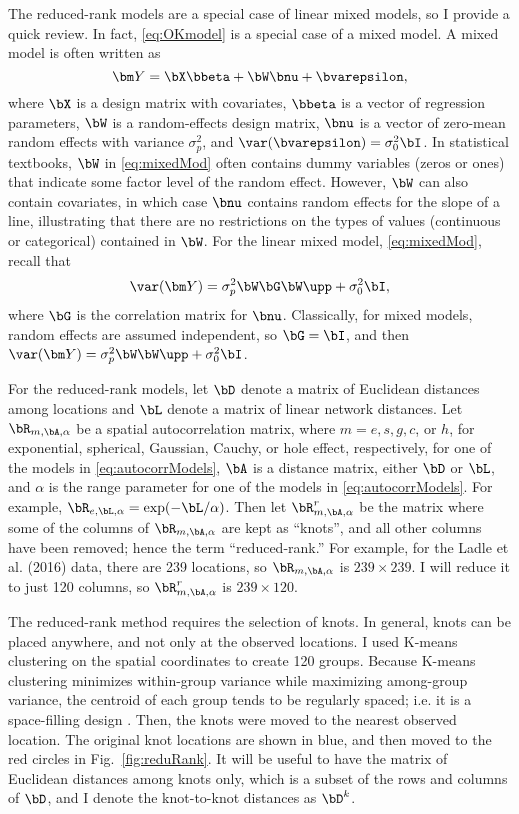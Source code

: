 The reduced-rank models are a special case of linear mixed models, so I provide a quick review. In fact, \ref{eq:OKmodel} is a special case of a mixed model. A mixed model is often written as
\begin{equation} \label{eq:mixedMod}
    \bm Y = \bX\bbeta + \bW\bnu + \bvarepsilon,
\end{equation}
 where $\bX$ is a design matrix with covariates, $\bbeta$ is a vector of regression parameters, $\bW$ is a random-effects design matrix, $\bnu$ is a vector of zero-mean random effects with variance $\sigma^2_p$, and $\var(\bvarepsilon) = \sigma^2_0 \bI$.  In statistical textbooks, $\bW$ in \ref{eq:mixedMod} often contains dummy variables (zeros or ones) that indicate some factor level of the random effect.  However, $\bW$ can also contain covariates, in which case $\bnu$ contains random effects for the slope of a line, illustrating that there are no restrictions on the types of values (continuous or categorical) contained in $\bW$. For the linear mixed model, \ref{eq:mixedMod}, recall that
 \begin{equation} \label{eq:varMixedMod}
 \var(\bm Y) = \sigma^2_p\bW\bG\bW\upp + \sigma^2_0\bI, 
 \end{equation}
 where $\bG$ is the correlation matrix for $\bnu$.  Classically, for mixed models, random effects are assumed independent, so $\bG = \bI$, and then $\var(\bm Y) = \sigma^2_p\bW\bW\upp + \sigma^2_0\bI$.  

 For the reduced-rank models, let $\bD$ denote a matrix of Euclidean distances among locations and $\bL$ denote a matrix of linear network distances. Let $\bR_{m,\bA,\alpha}$ be a spatial autocorrelation matrix, where $m = e, s, g, c$, or $h$, for exponential, spherical, Gaussian, Cauchy, or hole effect, respectively, for one of the models in \ref{eq:autocorrModels}, $\bA$ is a distance matrix, either $\bD$ or $\bL$, and $\alpha$ is the range parameter for one of the models in \ref{eq:autocorrModels}.  For example, $\bR_{e,\bL,\alpha} = \exp(-\bL/\alpha)$.  Then let $\bR^r_{m,\bA,\alpha}$ be the matrix where some of the columns of $\bR_{m,\bA,\alpha}$ are kept as ``knots'', and all other columns have been removed; hence the term ``reduced-rank.''  For example, for the Ladle et al. (2016) data, there are 239 locations, so $\bR_{m,\bA,\alpha}$ is $239 \times 239$. I will reduce it to just 120 columns, so $\bR^r_{m,\bA,\alpha}$ is $239 \times 120$.

The reduced-rank method requires the selection of knots.  In general, knots can be placed anywhere, and not only at the observed locations.  I used K-means clustering \citep{MacQ:some:1967} on the spatial coordinates to create 120 groups. Because K-means clustering minimizes within-group variance while maximizing among-group variance, the centroid of each group tends to be regularly spaced; i.e. it is a space-filling design \citep[e.g.][]{Ver:Jans:esti:2015}.  Then, the knots were moved to the nearest observed location. The original knot locations are shown in blue, and then moved to the red circles in Fig.~\ref{fig:reduRank}.  It will be useful to have the matrix of Euclidean distances among knots only, which is a subset of the rows and columns of $\bD$, and I denote the knot-to-knot distances as $\bD^k$. 

